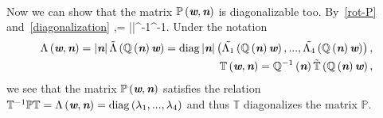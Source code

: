 \paragraph{}
Now we can show that the matrix $\mathbb{P}\left(\textit{\textbf{w}},\textit{\textbf{n}}\right)$ is diagonalizable too.
By~\eqref{rot-P} and~\eqref{diagonalization}
\be
\label{final_p_diag}
\lo{},\ro = \left|\right|^{-1}\lo{}\ro{}\lo{}\lo{}\ro{}\ro\tilde{\Lambda}\lo{}\lo{}\ro{}\ro{}\lo{}\lo{}\ro{}\ro^{-1}\lo{}\ro.
\ee
Under the notation
\begin{eqnarray}
\nonumber
\Lambda\left(\textit{\textbf{w}},\textit{\textbf{n}}\right) = \left|\textit{\textbf{n}}\right|\tilde{\Lambda}\left(\mathbb{Q}\left(\textit{\textbf{n}}\right)\textit{\textbf{w}}\right) = \mathrm{diag}\left|\textit{\textbf{n}}\right|\left(\tilde{\Lambda_1}\left(\mathbb{Q}\left(\textit{\textbf{n}}\right)\textit{\textbf{w}}\right), ..., \tilde{\Lambda_4}\left(\mathbb{Q}\left(\textit{\textbf{n}}\right)\textit{\textbf{w}}\right)\right),\\
\mathbb{T}\left(\textit{\textbf{w}},\textit{\textbf{n}}\right) = \mathbb{Q}^{-1}\left(\textit{\textbf{n}}\right)\tilde{\mathbb{T}}\left(\mathbb{Q}\left(\textit{\textbf{n}}\right)\textit{\textbf{w}}\right),
\end{eqnarray}
we see that the matrix $\mathbb{P}\left(\textit{\textbf{w}},\textit{\textbf{n}}\right)$ satisfies the relation $\mathbb{T}^{-1}\mathbb{P}\mathbb{T} = \Lambda\left(\textit{\textbf{w}},\textit{\textbf{n}}\right) = \mathrm{diag}\left( \lambda_1, ..., \lambda_4\right)$ and thus $\mathbb{T}$ diagonalizes the matrix $\mathbb{P}$.
